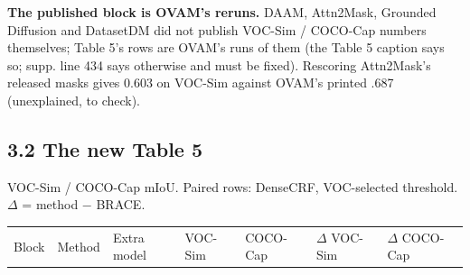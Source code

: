 \documentclass[
  10pt,
]{article}
\newcounter{none} %
\begin{document}
\textbf{The published block is OVAM's reruns.} DAAM, Attn2Mask, Grounded
Diffusion and DatasetDM did not publish VOC-Sim / COCO-Cap numbers
themselves; Table 5's rows are OVAM's runs of them (the Table 5 caption
says so; supp. line 434 says otherwise and must be fixed). Rescoring
Attn2Mask's released masks gives 0.603 on VOC-Sim against OVAM's printed
.687 (unexplained, to check).

\subsection{3.2 The new Table 5}

VOC-Sim / COCO-Cap mIoU. Paired rows: DenseCRF, VOC-selected threshold.
\ensuremath{\Delta} = method \ensuremath{-} BRACE.

{\def\LTcaptype{none} %
\begin{longtable}[]{@{}
  >{\raggedright\arraybackslash}p{}
  >{\raggedright\arraybackslash}p{}
  >{\raggedright\arraybackslash}p{}
  >{\raggedright\arraybackslash}p{}
  >{\raggedright\arraybackslash}p{}
  >{\raggedright\arraybackslash}p{}
  >{\raggedright\arraybackslash}p{}@{}}
\toprule\noalign{}
\begin{minipage}[b]{\linewidth}\raggedright
Block
\end{minipage} & \begin{minipage}[b]{\linewidth}\raggedright
Method
\end{minipage} & \begin{minipage}[b]{\linewidth}\raggedright
Extra model
\end{minipage} & \begin{minipage}[b]{\linewidth}\raggedright
VOC-Sim
\end{minipage} & \begin{minipage}[b]{\linewidth}\raggedright
COCO-Cap
\end{minipage} & \begin{minipage}[b]{\linewidth}\raggedright
\ensuremath{\Delta} VOC-Sim
\end{minipage} & \begin{minipage}[b]{\linewidth}\raggedright
\ensuremath{\Delta} COCO-Cap
\end{minipage} \\

\end{longtable}}
\end{document}
